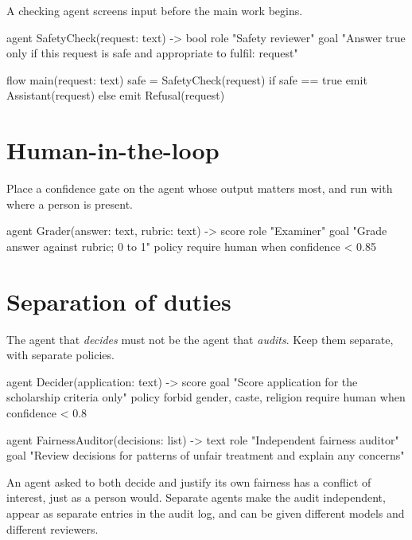 A checking agent screens input before the main work begins.

\begin{algo}
agent SafetyCheck(request: text) -> bool {
    role "Safety reviewer"
    goal "Answer true only if this request is safe and appropriate to fulfil: {request}"
}

flow main(request: text) {
    safe = SafetyCheck(request)
    if safe == true {
        emit Assistant(request)
    } else {
        emit Refusal(request)
    }
}
\end{algo}

\section{Human-in-the-loop}

Place a confidence gate on the agent whose output matters most, and run with  where a person is present.

\begin{algo}
agent Grader(answer: text, rubric: text) -> score {
    role  "Examiner"
    goal  "Grade {answer} against {rubric}; 0 to 1"
    policy { require human when confidence < 0.85 }
}
\end{algo}

\section{Separation of duties}

The agent that \emph{decides} must not be the agent that \emph{audits}. Keep them separate, with separate policies.

\begin{algo}
agent Decider(application: text) -> score {
    goal   "Score {application} for the scholarship criteria only"
    policy { forbid gender, caste, religion  require human when confidence < 0.8 }
}

agent FairnessAuditor(decisions: list) -> text {
    role "Independent fairness auditor"
    goal "Review {decisions} for patterns of unfair treatment and explain any concerns"
}
\end{algo}

\begin{ethics}
An agent asked to both decide and justify its own fairness has a conflict of interest, just as a person would. Separate agents make the audit independent, appear as separate entries in the audit log, and can be given different models and different reviewers.
\end{ethics}

